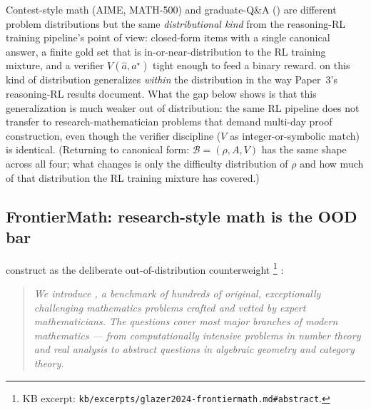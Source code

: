 \begin{intuition}
Contest-style math (AIME, MATH-500) and graduate-Q\&A
() are different problem distributions but the same
\emph{distributional kind} from the reasoning-RL training pipeline's
point of view: closed-form items with a single canonical answer, a
finite gold set that is in-or-near-distribution to the RL training
mixture, and a verifier $V(\hat{a}, a^\star)$ tight enough to feed a
binary reward.  on this kind of distribution generalizes
\emph{within} the distribution in the way Paper~3's reasoning-RL
results document. What the  gap below shows is that this
generalization is much weaker out of distribution: the same RL
pipeline does not transfer to research-mathematician problems that
demand multi-day proof construction, even though the verifier
discipline ($V$ as integer-or-symbolic match) is identical.
(Returning to canonical form: $\mathcal{B} = (\rho, A, V)$ has the
same shape across all four; what changes is only the difficulty
distribution of $\rho$ and how much of that distribution the RL
training mixture has covered.)
\end{intuition}

\subsection{FrontierMath: research-style math is the OOD bar}
\label{sec:reasoning-frontiermath}

\citet{glazer2024-frontiermath} construct  as the
deliberate out-of-distribution counterweight%
\footnote{KB excerpt: \nolinkurl{kb/excerpts/glazer2024-frontiermath.md#abstract}.}
\citep[\S{}abstract]{glazer2024-frontiermath}:

\begin{quote}\itshape
We introduce , a benchmark of hundreds of original,
exceptionally challenging mathematics problems crafted and vetted by
expert mathematicians. The questions cover most major branches of
modern mathematics --- from computationally intensive problems in
number theory and real analysis to abstract questions in algebraic
geometry and category theory.
\end{quote}

